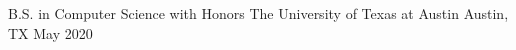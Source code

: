 

\begin{cventries}

  \cventry
  {B.S. in Computer Science with Honors} %
  {The University of Texas at Austin} %
  {Austin, TX} %
  {May 2020} %
  {}

\end{cventries}
